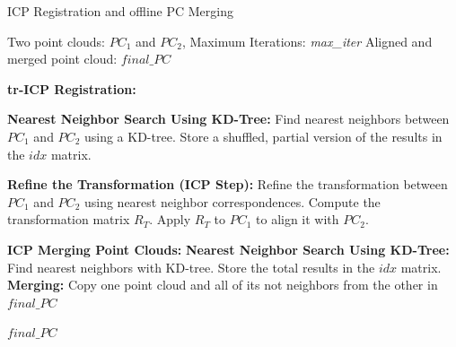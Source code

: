 \begin{algorithm}[tbh]
\caption{ICP Registration and offline PC Merging} \label{algICP}
\begin{algorithmic}[1]
\REQUIRE Two point clouds: $PC_1$ and $PC_2$, Maximum Iterations: \textit{max\_iter}
\ENSURE Aligned and merged point cloud: $final\_PC$

\STATE \textbf{tr-ICP Registration:}
    
        \STATE \textbf{Nearest Neighbor Search Using KD-Tree:}
        \STATE \hspace{0.3cm} Find nearest neighbors between $PC_1$ and $PC_2$ using a KD-tree.
        \STATE \hspace{0.3cm} Store a shuffled, partial version of the results in the $idx$ matrix.
    
        \STATE \textbf{Refine the Transformation (ICP Step):}
        \STATE \hspace{0.3cm} Refine the transformation between $PC_1$ and $PC_2$ using nearest neighbor correspondences.
        \STATE \hspace{0.3cm} Compute the transformation matrix $R_T$.
        \STATE \hspace{0.3cm} Apply $R_T$ to $PC_1$ to align it with $PC_2$.
    
    \ENDFOR

\STATE \textbf{ICP Merging Point Clouds:}
    \STATE \hspace{0.3cm} \textbf{Nearest Neighbor Search Using KD-Tree:}
        \STATE \hspace{0.6cm} Find nearest neighbors with KD-tree.
        \STATE \hspace{0.6cm} Store the total results in the $idx$ matrix.
    \STATE \hspace{0.3cm} \textbf{Merging:}
        \STATE \hspace{0.3cm} Copy one point cloud and all of its not neighbors from the other in $final\_PC$
    
\RETURN $final\_PC$
\end{algorithmic}
\end{algorithm}

